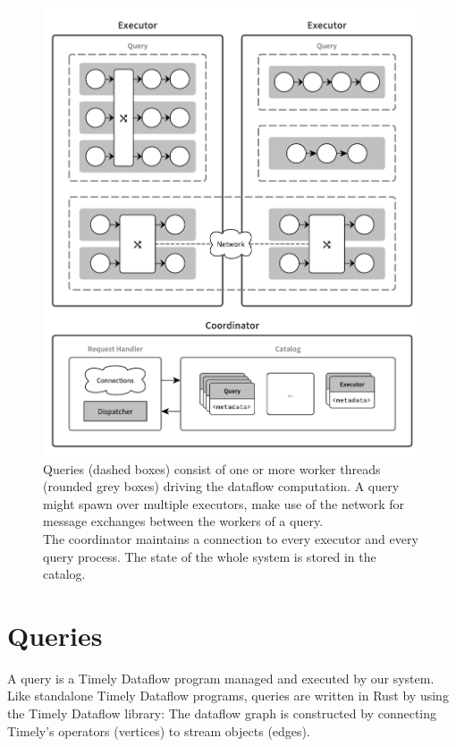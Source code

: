 \begin{figure}[ht]
  \centering
    \includegraphics[width=1\textwidth]{figures/components}
  \caption[System architecture.]{ Queries (dashed boxes) consist of one or
  more worker threads (rounded grey boxes) driving the dataflow computation.
  A query might spawn over multiple executors, make use of the network for message exchanges
  between the workers of a query.\\
  The coordinator maintains a connection to every  executor and every query process.
  The state of the whole system is stored in the catalog.}
  \label{fig:components}
\end{figure}

\section{Queries}

A query is a Timely Dataflow program managed and executed by our system. Like
standalone Timely Dataflow programs, queries are written in Rust by using the
Timely Dataflow library: The dataflow graph is constructed by connecting
Timely's operators (vertices) to stream objects (edges).

